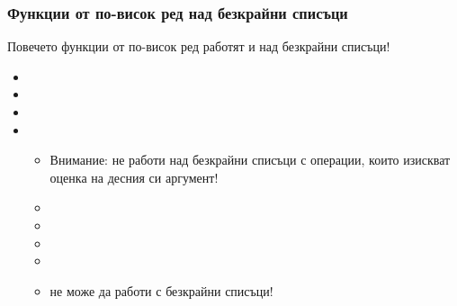 \documentclass{beamer}
\begin{document}
\begin{frame}
  \frametitle{Функции от по-висок ред над безкрайни списъци}

  Повечето функции от по-висок ред работят и над безкрайни списъци!
  \begin{itemize}[<+->]
  \item {}
  \item {}
  \item {}
  \item {}
    \begin{itemize}
    \item \alert{Внимание:}  не работи над безкрайни списъци с операции, които изискват оценка на десния си аргумент!
    \item {}
    \item {}
    \item {}
    \item {}
    \item \alert{ не може да работи с безкрайни списъци!}
    \end{itemize}
  \end{itemize}
\end{frame}
\end{document}
